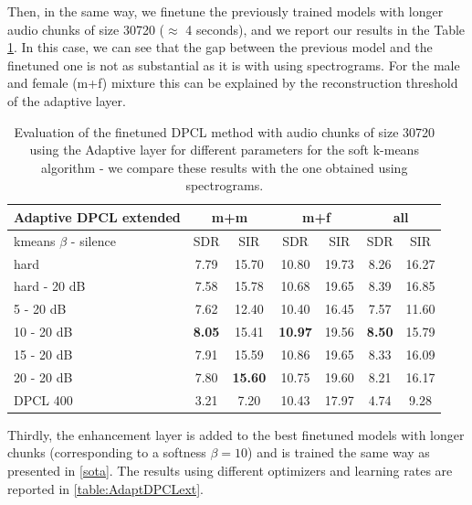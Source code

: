 \documentclass[master, tikz, final,11pt, dvipdfmx]{iscs-thesis}
\begin{document}
Then, in the same way, we finetune the previously trained models with longer audio chunks of size 30720 ($\approx$ 4 seconds), and we report our results in the Table \ref{table:AdaptDPCLext}. In this case, we can see that the gap between the previous model and the finetuned one is not as substantial as it is with using spectrograms. For the male and female (m+f) mixture this can be explained by the reconstruction threshold of the adaptive layer.

\begin{table}[h!]
\centering
\begin{tabular}{l|c|c|c|c|c|c}
Adaptive DPCL extended & \multicolumn{2}{c|}{m+m} & \multicolumn{2}{c|}{m+f} & \multicolumn{2}{c}{all} \\ 
\hline 
kmeans $\beta$ - silence & SDR & SIR & SDR & SIR & SDR & SIR \\ 
\hline 
hard & 7.79 & 15.70 & 10.80 & 19.73 & 8.26 & 16.27 \\  
hard - 20 dB & 7.58 & 15.78 & 10.68 & 19.65 & 8.39 & 16.85 \\ 
\hline 
\hline 
5 - 20 dB & 7.62 & 12.40 & 10.40 & 16.45 & 7.57 & 11.60 \\ 
10 - 20 dB & \cellcolor{green}\textbf{8.05} & \cellcolor{green}15.41 & \cellcolor{green}\textbf{10.97} & \cellcolor{green}19.56 & \cellcolor{green}\textbf{8.50} & \cellcolor{green}15.79 \\ 
15 - 20 dB & 7.91 & 15.59 & 10.86 & 19.65 & 8.33 & 16.09 \\ 
20 - 20 dB & 7.80 & \textbf{15.60} & 10.75 & 19.60 & 8.21 & 16.17 \\ 
\hline 
\hline 
DPCL 400 & 3.21 & 7.20 & 10.43 & 17.97 & 4.74 & 9.28 \\ 
\end{tabular}
\caption[Evaluation of the finetuned DPCL method with audio chunks of size 30720 using the Adaptive layer]{Evaluation of the finetuned DPCL method with audio chunks of size 30720 using the Adaptive layer for different parameters for the soft k-means algorithm - we compare these results with the one obtained using spectrograms.}
\label{table:AdaptDPCLext}
\end{table}


Thirdly, the enhancement layer is added to the best finetuned models with longer chunks (corresponding to a softness $\beta=10$) and is trained the same way as presented in \autoref{sota}. The results using different optimizers and learning rates are reported in \autoref{table:AdaptDPCLext}.
\end{document}
